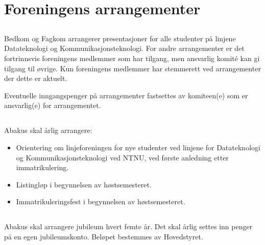 \section{Foreningens arrangementer}

\subsection{}
Bedkom og Fagkom arrangerer presentasjoner for alle studenter på
linjene Datateknologi og Kommunikasjonsteknologi. For andre arrangementer er
det fortrinnsvis foreningens medlemmer som har tilgang, men ansvarlig komité
kan gi tilgang til øvrige. Kun foreningens medlemmer har stemmerett ved arrangementer der
dette er aktuelt.

Eventuelle inngangspenger på arrangementer fastsettes av komiteen(e) som er
ansvarlig(e) for arrangementet.

\subsection{}
Abakus skal årlig arrangere:

\begin{itemize}
  \item Orientering om linjeforeningen for nye studenter ved linjene for
        Datateknologi og Kommunikasjonsteknologi ved NTNU, ved første anledning etter immatrikulering.
  \item Listingløp i begynnelsen av høstsemesteret.
  \item Immatrikuleringsfest i begynnelsen av høstsemesteret.
\end{itemize}

\subsection{}
Abakus skal arrangere jubileum hvert femte år. Det skal årlig settes inn penger
på en egen jubileumskonto. Beløpet bestemmes av Hovedstyret.
